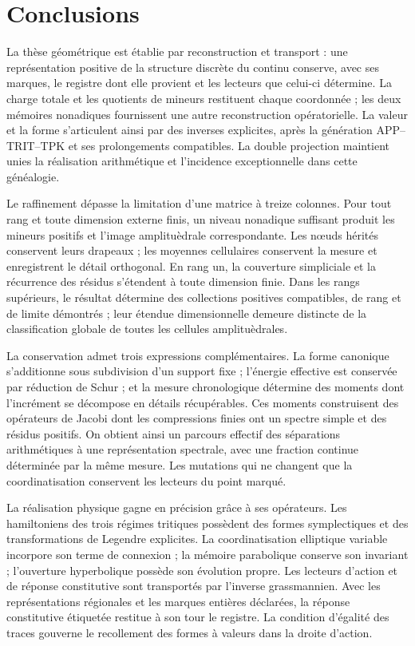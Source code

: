 \clearpage
\section{Conclusions}
\label{sec:conclusions-final}
\begingroup
\fontsize{10.2}{12.2}\selectfont
\setlength{\parskip}{2.5pt plus .5pt}

La thèse géométrique est établie par reconstruction et transport : une représentation positive de la structure discrète du continu conserve, avec ses marques, le registre dont elle provient et les lecteurs que celui-ci détermine. La charge totale et les quotients de mineurs restituent chaque coordonnée ; les deux mémoires nonadiques fournissent une autre reconstruction opératorielle. La valeur et la forme s'articulent ainsi par des inverses explicites, après la génération APP--TRIT--TPK et ses prolongements compatibles. La double projection maintient unies la réalisation arithmétique et l'incidence exceptionnelle dans cette généalogie.

Le raffinement dépasse la limitation d'une matrice à treize colonnes. Pour tout rang et toute dimension externe finis, un niveau nonadique suffisant produit les mineurs positifs et l'image amplituèdrale correspondante. Les nœuds hérités conservent leurs drapeaux ; les moyennes cellulaires conservent la mesure et enregistrent le détail orthogonal. En rang un, la couverture simpliciale et la récurrence des résidus s'étendent à toute dimension finie. Dans les rangs supérieurs, le résultat détermine des collections positives compatibles, de rang et de limite démontrés ; leur étendue dimensionnelle demeure distincte de la classification globale de toutes les cellules amplituèdrales.

La conservation admet trois expressions complémentaires. La forme canonique s'additionne sous subdivision d'un support fixe ; l'énergie effective est conservée par réduction de Schur ; et la mesure chronologique détermine des moments dont l'incrément se décompose en détails récupérables. Ces moments construisent des opérateurs de Jacobi dont les compressions finies ont un spectre simple et des résidus positifs. On obtient ainsi un parcours effectif des séparations arithmétiques à une représentation spectrale, avec une fraction continue déterminée par la même mesure. Les mutations qui ne changent que la coordinatisation conservent les lecteurs du point marqué.

La réalisation physique gagne en précision grâce à ses opérateurs. Les hamiltoniens des trois régimes tritiques possèdent des formes symplectiques et des transformations de Legendre explicites. La coordinatisation elliptique variable incorpore son terme de connexion ; la mémoire parabolique conserve son invariant ; l'ouverture hyperbolique possède son évolution propre. Les lecteurs d'action et de réponse constitutive sont transportés par l'inverse grassmannien. Avec les représentations régionales et les marques entières déclarées, la réponse constitutive étiquetée restitue à son tour le registre. La condition d'égalité des traces gouverne le recollement des formes à valeurs dans la droite d'action.

